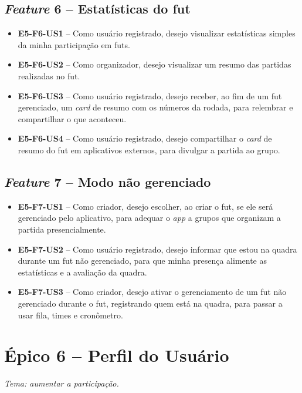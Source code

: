 \begin{apendicesenv}
    \subsection*{\textit{Feature} 6 -- Estatísticas do fut}
    \begin{itemize}
        \item \textbf{E5-F6-US1} -- Como usuário registrado, desejo visualizar estatísticas simples da minha participação em futs.
        \item \textbf{E5-F6-US2} -- Como organizador, desejo visualizar um resumo das partidas realizadas no fut.
        \item \textbf{E5-F6-US3} -- Como usuário registrado, desejo receber, ao fim de um fut gerenciado, um \textit{card} de resumo com os números da rodada, para relembrar e compartilhar o que aconteceu.
        \item \textbf{E5-F6-US4} -- Como usuário registrado, desejo compartilhar o \textit{card} de resumo do fut em aplicativos externos, para divulgar a partida ao grupo.
    \end{itemize}

    \subsection*{\textit{Feature} 7 -- Modo não gerenciado}
    \begin{itemize}
        \item \textbf{E5-F7-US1} -- Como criador, desejo escolher, ao criar o fut, se ele será gerenciado pelo aplicativo, para adequar o \textit{app} a grupos que organizam a partida presencialmente.
        \item \textbf{E5-F7-US2} -- Como usuário registrado, desejo informar que estou na quadra durante um fut não gerenciado, para que minha presença alimente as estatísticas e a avaliação da quadra.
        \item \textbf{E5-F7-US3} -- Como criador, desejo ativar o gerenciamento de um fut não gerenciado durante o fut, registrando quem está na quadra, para passar a usar fila, times e cronômetro.
    \end{itemize}

    \section*{Épico 6 -- Perfil do Usuário}
    \textit{Tema: aumentar a participação.}


\end{apendicesenv}
